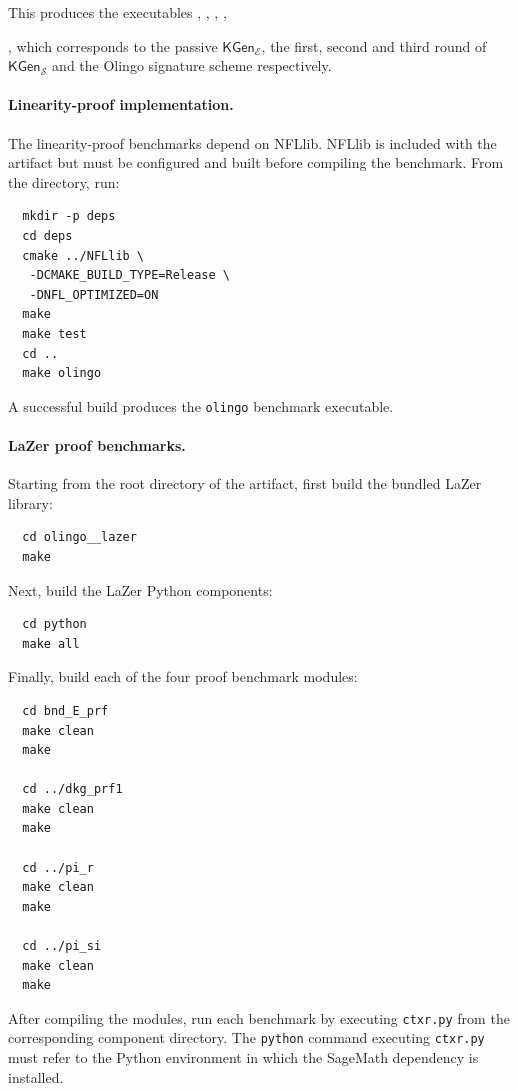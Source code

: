 \documentclass[nonacm,sigconf]{acmart}
\begin{document}
This produces the executables , , , ,

\noindent{}, which corresponds to the passive $\mathsf{KGen}_{\mathcal{E}}$, the first, second and third round of $\mathsf{KGen}_{\mathcal{S}}$ and the Olingo signature scheme respectively.

\paragraph{Linearity-proof implementation.} The linearity-proof benchmarks depend on NFLlib. NFLlib is included with the artifact but must be configured and built before compiling the benchmark. From the  directory, run:

\begin{verbatim}
  mkdir -p deps
  cd deps
  cmake ../NFLlib \
   -DCMAKE_BUILD_TYPE=Release \
   -DNFL_OPTIMIZED=ON
  make
  make test
  cd ..
  make olingo
\end{verbatim}

A successful build produces the \texttt{olingo} benchmark executable.

\paragraph{LaZer proof benchmarks.}
Starting from the root directory of the artifact, first build the bundled LaZer library:

\begin{verbatim}
  cd olingo__lazer
  make
\end{verbatim}

Next, build the LaZer Python components:

\begin{verbatim}
  cd python
  make all
\end{verbatim}

Finally, build each of the four proof benchmark modules:

\begin{verbatim}
  cd bnd_E_prf
  make clean
  make

  cd ../dkg_prf1
  make clean
  make

  cd ../pi_r
  make clean
  make

  cd ../pi_si
  make clean
  make
\end{verbatim}

After compiling the modules, run each benchmark by executing \texttt{ctxr.py} from the corresponding component directory. The \texttt{python} command executing \texttt{ctxr.py} must refer to the Python environment in which the SageMath dependency is installed.
\end{document}
